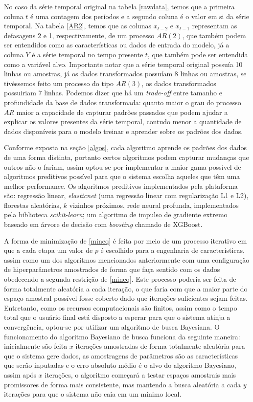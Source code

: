 \documentclass[twocolumn]{rbef}
\newcommand{\1}{\mathbbm{1}}
\begin{document}
No caso da série temporal original na tabela \ref{rawdata}, temos que a primeira coluna $t$ é uma contagem dos períodos e a segundo coluna é o valor em si da série temporal. Na tabela \ref{AR2}, temos que as colunas $x_{t-2}$ e $x_{t-1}$ representam as defasagens 2 e 1, respectivamente, de um processo $AR(2)$, que também podem ser entendidos como as características ou dados de entrada do modelo, já a coluna $Y$ é a série temporal no tempo presente $t$, que também pode ser entendida como a variável alvo. Importante notar que a série temporal original possuía 10 linhas ou amostras, já os dados transformados possuíam 8 linhas ou amostras, se tivéssemos feito um processo do tipo $AR(3)$, os dados transformados possuiriam 7 linhas. Podemos dizer que há um \textit{trade-off} entre tamanho e profundidade da base de dados transformada: quanto maior o grau do processo $AR$ maior a capacidade de capturar padrões passados que podem ajudar a explicar os valores presentes da série temporal, contudo menor a quantidade de dados disponíveis para o modelo treinar e aprender sobre os padrões dos dados.

Conforme exposta na seção \ref{algos}, cada algoritmo aprende os padrões dos dados de uma forma distinta, portanto certos algoritmos podem capturar mudanças que outros não o fariam, assim optou-se por implementar a maior gama possível de algoritmos preditivos possível para que o sistema escolha aqueles que têm uma melhor performance. Os algoritmos preditivos implementados pela plataforma são: regressão linear, \textit{elasticnet} (uma regressão linear com regularização L1 e L2), florestas aleatórias, $k$ vizinhos próximos, rede neural profunda, implementados pela biblioteca \textit{scikit-learn}\cite{Pedregosa}; um algoritmo de impulso de gradiente extremo baseado em árvore de decisão com \textit{boosting} chamado de XGBoost\cite{Chen}.

A forma de minimização de \ref{mineq} é feita por meio de um processo iterativo em que a cada etapa um valor de $p$ é escolhido para a engenharia de características, assim como um dos algoritmos mencionados anteriormente com uma configuração de hiperparâmetros amostrados de forma que faça sentido com os dados obedecendo a segunda restrição de \ref{mineq}. Este processo poderia ser feita de forma totalmente aleatória a cada iteração, o que faria com que a maior parte do espaço amostral possível fosse coberto dado que iterações suficientes sejam feitas. Entretanto, como os recursos computacionais são finitos, assim como o tempo total que o usuário final está disposto a esperar para que o sistema atinja a convergência, optou-se por utilizar um algoritmo de busca Bayesiana\cite{Lévesque}. O funcionamento do algoritmo Bayesiano de busca funciona da seguinte maneira: inicialmente são feita $x$ iterações amostradas de forma totalmente aleatória para que o sistema gere dados, as amostragens de parâmetros são as características que serão inputadas e o erro absoluto médio é o alvo do algoritmo Bayesiano, assim após $x$ iterações, o algoritmo começará a testar espaços amostrais mais promissores de forma mais consistente, mas mantendo a busca aleatória a cada $y$ iterações para que o sistema não caia em um mínimo local.
\end{document}
